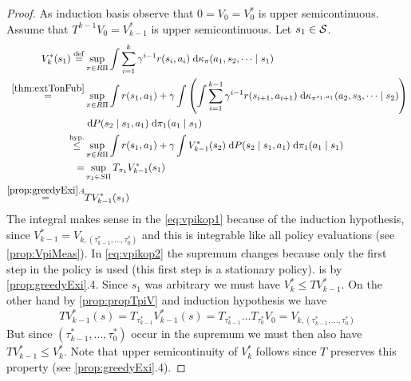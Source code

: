 \begin{proof}
  As induction basis observe that $0 = V_0 = V_0^*$ is upper semicontinuous.
  Assume that $T^{k-1} V_0 = V^*_{k-1}$ is upper semicontinuous.
  Let $s_1 \in \mathcal{S}$.
  \begin{align}
    V^*_k(s_1) 
    \stackrel{\mathrm{def}}{=} &
    \sup_{\pi \in R\Pi} \int \sum_{i=1}^k \gamma^{i-1} r(s_i, a_i)
    \; \mathrm{d} \kappa_\pi(a_1, s_2, \dots \mid s_1)
    \\
    \stackrel{\ref{thm:extTonFub}}{=} &
    \sup_{\pi \in R\Pi} \int r(s_1, a_1)
     + \gamma \int \left(
      \int \sum_{i=1}^{k-1} \gamma^{i-1} r(s_{i+1}, a_{i+1}) \; \mathrm{d}
      \kappa_{\pi^{s_1, a_1}}(a_2, s_3, \dots \mid s_2)
    \right) 
    \\ & \; \mathrm{d} P(s_2 \mid s_1, a_1) \; \mathrm{d} \pi_1(a_1 \mid s_1)
    \\
    \stackrel{\mathrm{hyp.}} \leq &
    \sup_{\pi \in R\Pi} \int r(s_1, a_1)
    + \gamma \int V^*_{k-1}(s_2)
    \; \mathrm{d} P(s_2 \mid s_1, a_1) \; \mathrm{d} \pi_1(a_1 \mid s_1)
    \label{eq:vpikop1}
    \\
    = &
    \sup_{\pi_1 \in S\Pi} T_{\pi_1} V^*_{k-1}(s_1)
    \label{eq:vpikop2}
    \\ \stackrel{\ref{prop:greedyExi}.4}{=} & T V^*_{k-1}(s_1) 
    \label{eq:vpikop3}
  \end{align}
  The integral makes sense in the \cref{eq:vpikop1} because of the
  induction hypothesis, since
  $V_{k-1}^* = V_{k,(\tau^*_{k-1}, \dots, \tau^*_0)}$ and this
  is integrable like all policy evaluations (see \cref{prop:VpiMeas}).
  In \cref{eq:vpikop2}
  the supremum changes because only the first
  step in the policy is used (this first step is a stationary policy).
   is by \cref{prop:greedyExi}.4.
  Since $s_1$ was arbitrary we must have $V_k^* \leq TV_{k-1}^*$.
  On the other hand by \cref{prop:propTpiV} and induction hypothesis we have
  \[T V^*_{k-1}(s) = T_{\tau^*_{k-1}} V^*_{k-1}(s)
    = T_{\tau^*_{k-1}} \dots T_{\tau^*_0} V_0
  = V_{k, (\tau^*_{k-1}, \dots, \tau^*_0)} \]
  But since $(\tau^*_{k-1}, \dots, \tau^*_0)$ occur in the supremum
  we must then also have $TV_{k-1}^* \leq V^*_k$.
  Note that upper semicontinuity of $V^*_k$ follows since $T$ preserves
  this property (see \cref{prop:greedyExi}.4).
\end{proof}

